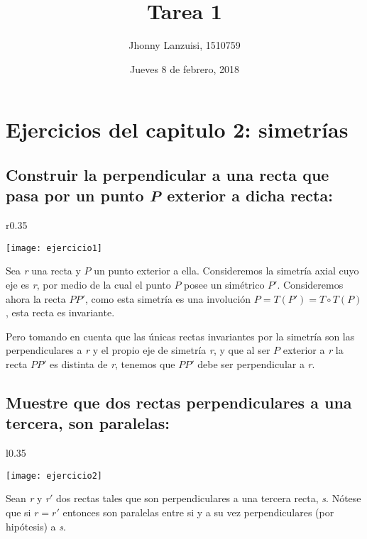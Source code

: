 \documentclass[12pt,a4paper]{article}
\title{Tarea 1}
\author{Jhonny Lanzuisi, 1510759}
\date{Jueves 8 de febrero, 2018}
\begin{document}
	\maketitle
	\section*{Ejercicios del capitulo 2: simetrías}
	\subsection{Construir la perpendicular a una recta que pasa por un punto \textit{P} exterior a dicha recta:} 
	
	\begin{wrapfigure}[10]{r}{0.35\textwidth}
		\begin{center}
			\texttt{[image: ejercicio1]}
		\end{center}
	\end{wrapfigure}


Sea \textit{r} una recta y \(P\) un punto exterior a ella. Consideremos la simetría axial cuyo eje es \textit{r}, por medio de la cual el punto \(P\) posee un simétrico \(P'\). Consideremos ahora la recta \(PP'\), como esta simetría es una involución \(P = T(P') = T \circ T(P) \), esta recta es invariante.

Pero tomando en cuenta que las únicas rectas invariantes por la simetría son las perpendiculares a \textit{r} y el propio eje de simetría \textit{r}, y que al ser \(P\) exterior a \textit{r} la recta \(PP'\) es distinta de \textit{r}, tenemos que \(PP'\) debe ser perpendicular a \textit{r}.



\subsection{Muestre que dos rectas perpendiculares a una tercera, son paralelas:}

	\begin{wrapfigure}[11]{l}{0.35\textwidth}
		\begin{center}
			\texttt{[image: ejercicio2]}
		\end{center}
	\end{wrapfigure}

Sean \textit{r} y \textit{r}\('\) dos rectas tales que son perpendiculares a una tercera recta, \textit{s}. Nótese que si \(r=r'\) entonces son paralelas entre si y a su vez perpendiculares (por hipótesis) a \textit{s}.
\end{document}
